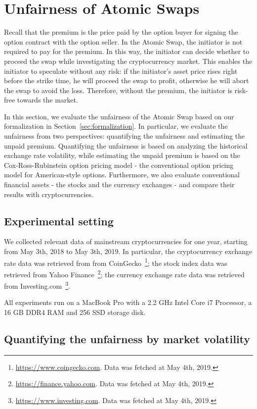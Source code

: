 \section{Unfairness of Atomic Swaps}
\label{sec:evaluation}

Recall that the premium is the price paid by the option buyer for signing the option contract with the option seller.
In the Atomic Swap, the initiator is not required to pay for the premium.
In this way, the initiator can decide whether to proceed the swap while investigating the cryptocurrency market.
This enables the initiator to speculate without any risk:
if the initiator's asset price rises right before the strike time, he will proceed the swap to profit, otherwise he will abort the swap to avoid the loss.
Therefore, without the premium, the initiator is risk-free towards the market.

In this section, we evaluate the unfairness of the Atomic Swap based on our formalization in Section~\ref{sec:formalization}.
In particular, we evaluate the unfairness from two perspectives: quantifying the unfairness and estimating the unpaid premium.
Quantifying the unfairness is based on analyzing the historical exchange rate volatility, while estimating the unpaid premium is based on the Cox-Ross-Rubinstein option pricing model - the conventional option pricing model for American-style options.
Furthermore, we also evaluate conventional financial assets - the stocks and the currency exchanges - and compare their results with cryptocurrencies.

\subsection{Experimental setting}

We collected relevant data of mainstream cryptocurrencies for one year, starting from May 3th, 2018 to May 3th, 2019.
In particular, the cryptocurrency exchange rate data was retrieved from from CoinGecko~\footnote{\url{https://www.coingecko.com}. Data was fetched at May 4th, 2019.};
the stock index data was retrieved from Yahoo Finance~\footnote{\url{https://finance.yahoo.com}. Data was fetched at May 4th, 2019.};
the currency exchange rate data was retrieved from Investing.com~\footnote{\url{https://www.investing.com}. Data was fetched at May 4th, 2019.}.

All experiments run on a MacBook Pro with a 2.2 GHz Intel Core i7 Processor, a 16 GB DDR4 RAM and 256 SSD storage disk.

\subsection{Quantifying the unfairness by market volatility}
\label{subsec:volatility_analysis}

